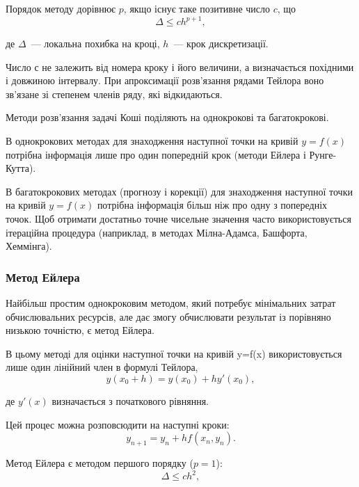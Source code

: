 Порядок методу дорівнює $p$, якщо існує таке позитивне число $c$, що
\begin{equation}\label{eq:delta}
  \Delta \le ch^{p+1},
\end{equation}

де ${\Delta}$~--- локальна похибка на кроці, ${h}$~--- крок дискретизації.

Число $с$ не залежить від номера кроку і його величини, а визначається
похідними і довжиною інтервалу. При апроксимації розв’язання рядами
Тейлора воно зв’язане зі степенем членів ряду, які відкидаються.

Методи розв’язання задачі Коші поділяють на однокрокові
та багатокрокові.

В однокрокових методах для знаходження наступної точки на
кривій $y=f(x)$ потрібна інформація лише про один попередній крок
(методи Ейлера і Рунге-Кутта).

В багатокрокових методах (прогнозу і корекції) для знаходження 
наступної точки на кривій $y=f(x)$ потрібна інформація більш ніж 
про одну з попередніх точок. Щоб отримати достатньо точне 
чисельне значення часто використовується ітераційна процедура 
(наприклад, в методах Мілна-Адамса, Башфорта, Хеммінга).

\subsubsection{Метод Ейлера}\label{sss:E1}

Найбільш простим однокроковим методом, який потребує мінімальних затрат обчислювальних ресурсів, але дає змогу обчислювати результат із порівняно низькою точністю, є метод Ейлера.

В цьому методі для оцінки наступної точки на кривій y=f(x) використовується лише один лінійний член в формулі Тейлора, 
\begin{equation}
  y(x_0+h)=y(x_0)+hy'(x_0),
\end{equation}

    де $y'(x)$ визначається з початкового рівняння.

    Цей процес можна розповсюдити на наступні кроки:
\begin{equation}
  y_{n+1}=y_{n}+hf(x_n,y_n).
\end{equation}

    Метод Ейлера є методом першого порядку ($p=1$):
\begin{equation}\label{eq:error}
  \Delta \le ch^{2},
\end{equation}
    
